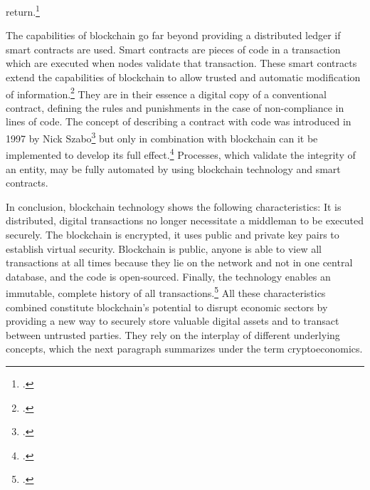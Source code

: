 return.\footcites[Cf.][p.12]{CataliniSimpleEconomicsBlockchain2017}[cf.][p.5 et seqq]{DavidsonEconomicsBlockchain2016}   



The capabilities of blockchain go far beyond providing a distributed ledger if smart contracts are used. Smart contracts are pieces of code in a transaction which are executed when nodes validate that transaction. These smart contracts extend the capabilities of blockchain to allow trusted and automatic modification of information.\footcite[Cf.][p.14]{Schutte.2017} They are in their essence a digital copy of a conventional contract, defining the rules and punishments in the case of non-compliance in lines of code. The concept of describing a contract with code was introduced in 1997 by Nick Szabo\footcite[][]{Szabo.1997} but only in combination with blockchain can it be implemented to develop its full effect.\footcites[Cf.][p.23]{Schlatt.2016}[cf.][p.22-24]{GOV.2016} Processes, which validate the integrity of an entity, may be fully automated by using blockchain technology and smart contracts.

In conclusion, blockchain technology shows the following characteristics: It is distributed, digital transactions no longer necessitate a middleman to be executed securely. The blockchain is encrypted, it uses public and private key pairs to establish virtual security. Blockchain is public, anyone is able to view all transactions at all times because they lie on the network and not in one central database, and the code is open-sourced. Finally, the technology enables an immutable, complete history of all transactions.\footcite[Cf.][p.5]{Tapscott.2017} All these characteristics combined constitute blockchain's potential to disrupt economic sectors by providing a new way to securely store valuable digital assets and to transact between untrusted parties. They rely on the interplay of different underlying concepts, which the next paragraph summarizes under the term cryptoeconomics.

